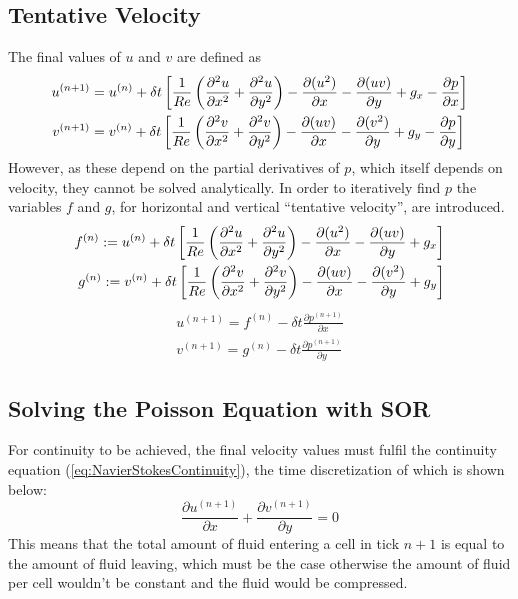 \subsection{Tentative Velocity}
The final values of $u$ and $v$ are defined as
\begin{equation}
\begin{aligned}
    u^{(n+1)} &= u^{(n)} + \delta{t}
    \left[
        \frac{1}{Re}
        \left(\frac{\partial{^2u}}{\partial{x^2}} + \frac{\partial{^2u}}{\partial{y^2}}\right) - \frac{\partial{(u^2)}}{\partial{x}} - \frac{\partial{(uv)}}{\partial{y}} + g_x - \frac{\partial{p}}{\partial{x}}
    \right] \\
    v^{(n+1)} &= v^{(n)} + \delta{t}
    \left[
        \frac{1}{Re}
        \left(\frac{\partial{^2v}}{\partial{x^2}} + \frac{\partial{^2v}}{\partial{y^2}}\right) - \frac{\partial{(uv)}}{\partial{x}} - \frac{\partial{(v^2)}}{\partial{y}} + g_y - \frac{\partial{p}}{\partial{y}}
    \right]
\end{aligned}
\end{equation}
However, as these depend on the partial derivatives of $p$, which itself depends on velocity, they cannot be solved analytically.
In order to iteratively find $p$ the variables $f$ and $g$, for horizontal and vertical ``tentative velocity'', are introduced.
\begin{equation}
\begin{aligned}
    f^{(n)} := u^{(n)} + \delta{t}
    \left[
        \frac{1}{Re}
        \left(\frac{\partial{^2u}}{\partial{x^2}} + \frac{\partial{^2u}}{\partial{y^2}}\right) - \frac{\partial{(u^2)}}{\partial{x}} - \frac{\partial{(uv)}}{\partial{y}} + g_x
    \right] \\
    g^{(n)} := v^{(n)} + \delta{t}
    \left[
        \frac{1}{Re}
        \left(\frac{\partial{^2v}}{\partial{x^2}} + \frac{\partial{^2v}}{\partial{y^2}}\right) - \frac{\partial{(uv)}}{\partial{x}} - \frac{\partial{(v^2)}}{\partial{y}} + g_y
    \right]
\end{aligned}
\end{equation}
\begin{equation}
\begin{aligned}
    u^{(n+1)} = f^{(n)} - \delta{t}\frac{\partial{p^{(n+1)}}}{\partial{x}} \\
    v^{(n+1)} = g^{(n)} - \delta{t}\frac{\partial{p^{(n+1)}}}{\partial{y}}
    \label{eq:uv_modified}
\end{aligned}
\end{equation}

\subsection{Solving the Poisson Equation with SOR}
\label{sec:SimulationPoisson}
For continuity to be achieved, the final velocity values must fulfil the continuity equation (\cref{eq:NavierStokesContinuity}), the time discretization of which is shown below:
\begin{equation}
    \frac{\partial{u^{(n+1)}}}{\partial{x}} + \frac{\partial{v^{(n+1)}}}{\partial{y}} = 0
\end{equation}
This means that the total amount of fluid entering a cell in tick $n+1$ is equal to the amount of fluid leaving, which must be the case otherwise the amount of fluid per cell wouldn't be constant and the fluid would be compressed.

